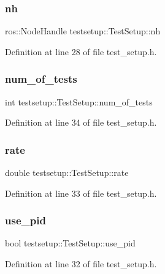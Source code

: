 \subsubsection{\texorpdfstring{nh}{nh}}
{\footnotesize\ttfamily ros\+::\+Node\+Handle testsetup\+::\+Test\+Setup\+::nh}



Definition at line 28 of file test\+\_\+setup.\+h.

\mbox{\label{group__sitl__test_ga53ac99edc3a6966ca9233341c7d58dee}} 
\subsubsection{\texorpdfstring{num\_of\_tests}{num\_of\_tests}}
{\footnotesize\ttfamily int testsetup\+::\+Test\+Setup\+::num\+\_\+of\+\_\+tests}



Definition at line 34 of file test\+\_\+setup.\+h.

\mbox{\label{group__sitl__test_ga912ce4eeed9553edb6bf2e636685a3a8}} 
\subsubsection{\texorpdfstring{rate}{rate}}
{\footnotesize\ttfamily double testsetup\+::\+Test\+Setup\+::rate}



Definition at line 33 of file test\+\_\+setup.\+h.

\mbox{\label{group__sitl__test_ga3c95d693bf1b2c713c6d8d6f8a5c73b3}} 
\subsubsection{\texorpdfstring{use\_pid}{use\_pid}}
{\footnotesize\ttfamily bool testsetup\+::\+Test\+Setup\+::use\+\_\+pid}



Definition at line 32 of file test\+\_\+setup.\+h.

